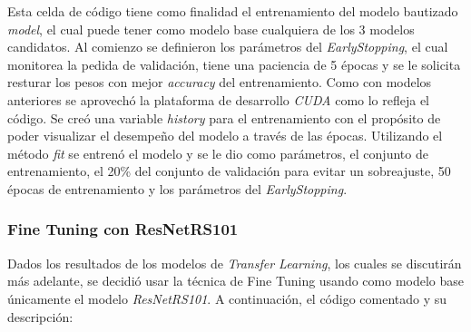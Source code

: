Esta celda de código tiene como finalidad el entrenamiento del modelo bautizado \textit{model}, el cual puede tener como modelo base cualquiera de los 3 modelos candidatos. Al comienzo se definieron los parámetros del \textit{EarlyStopping}, el cual monitorea la pedida de validación, tiene una paciencia de 5 épocas y se le solicita resturar los pesos con mejor \textit{accuracy} del entrenamiento. Como con modelos anteriores se aprovechó la plataforma de desarrollo \textit{CUDA} como lo refleja el código. Se creó una variable \textit{history} para el entrenamiento con el propósito de poder visualizar el desempeño del modelo a través de las épocas. Utilizando el método \textit{fit} se entrenó el modelo y se le dio como parámetros, el conjunto de entrenamiento, el 20\% del conjunto de validación para evitar un sobreajuste, 50 épocas de entrenamiento y los parámetros del \textit{EarlyStopping}.\\

\newpage

\subsubsection{Fine Tuning con ResNetRS101}

Dados los resultados de los modelos de \textit{Transfer Learning}, los cuales se discutirán más adelante, se decidió usar la técnica de Fine Tuning usando como modelo base únicamente el modelo \textit{ResNetRS101}. A continuación, el código comentado y su descripción: 

